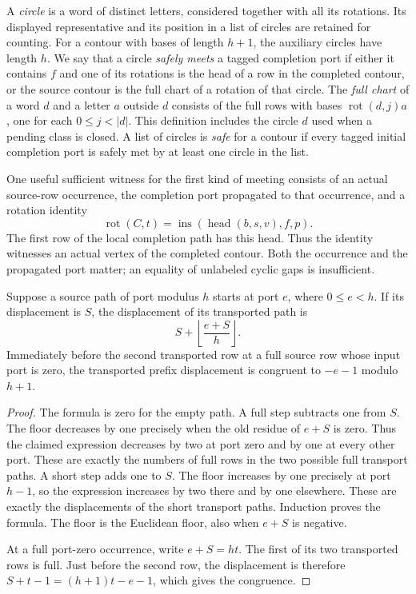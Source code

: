 A \emph{circle} is a word of distinct letters, considered together with
all its rotations. Its displayed representative and its position in a
list of circles are retained for counting. For a contour with bases of
length $h+1$, the auxiliary circles have length $h$. We say that a circle
\emph{safely meets} a tagged completion port if either it contains $f$
and one of its rotations is the head of a row in the completed contour,
or the source contour is the full chart of a rotation of that circle.
The \emph{full chart} of a word $d$ and a letter $a$ outside $d$ consists
of the full rows with bases $\operatorname{rot}(d,j)a$, one for each
$0\le j<|d|$. This definition includes the circle $d$ used when a pending
class is closed. A list of circles is \emph{safe} for a contour if every
tagged initial completion port is safely met by at least one circle in
the list.

One useful sufficient witness for the first kind of meeting consists of
an actual source-row occurrence, the completion port propagated to that
occurrence, and a rotation identity
\[
 \operatorname{rot}(C,t)
 =\operatorname{ins}(\operatorname{head}(b,s,v),f,p).
\]
The first row of the local completion path has this head. Thus the
identity witnesses an actual vertex of the completed contour. Both the
occurrence and the propagated port matter; an equality of unlabeled
cyclic gaps is insufficient.

\begin{lemma}\label{lem-assembly-prefix}
Suppose a source path of port modulus $h$ starts at port $e$, where
$0\le e<h$. If its displacement is $S$, the displacement of its
transported path is
\[
 S+\left\lfloor\frac{e+S}{h}\right\rfloor.
\]
Immediately before the second transported row at a full source row whose
input port is zero, the transported prefix displacement is congruent to
$-e-1$ modulo $h+1$.
\end{lemma}

\begin{proof}
The formula is zero for the empty path. A full step subtracts one from
$S$. The floor decreases by one precisely when the old residue of $e+S$
is zero. Thus the claimed expression decreases by two at port zero and
by one at every other port. These are exactly the numbers of full rows
in the two possible full transport paths. A short step adds one to $S$.
The floor increases by one precisely at port $h-1$, so the expression
increases by two there and by one elsewhere. These are exactly the
displacements of the short transport paths. Induction proves the formula.
The floor is the Euclidean floor, also when $e+S$ is negative.

At a full port-zero occurrence, write $e+S=ht$. The first of its two
transported rows is full. Just before the second row, the displacement
is therefore $S+t-1=(h+1)t-e-1$, which gives the congruence.
\end{proof}

